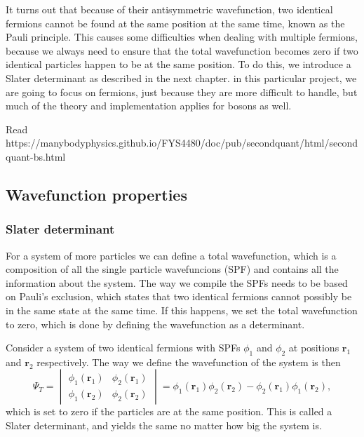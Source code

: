 It turns out that because of their antisymmetric wavefunction, two identical fermions cannot be found at the same position at the same time, known as the Pauli principle. This causes some difficulties when dealing with multiple fermions, because we always need to ensure that the total wavefunction becomes zero if two identical particles happen to be at the same position. To do this, we introduce a Slater determinant as described in the next chapter. in this particular project, we are going to focus on fermions, just because they are more difficult to handle, but much of the theory and implementation applies for bosons as well. 

Read https://manybodyphysics.github.io/FYS4480/doc/pub/secondquant/html/secondquant-bs.html

\subsection{Wavefunction properties} \label{subsec:wavefunction}



\subsubsection{Slater determinant} \label{subsubsec:slater}
For a system of more particles we can define a total wavefunction, which is a composition of all the single particle wavefuncions (SPF) and contains all the information about the system. The way we compile the SPFs needs to be based on Pauli's exclusion, which states that two identical fermions cannot possibly be in the same state at the same time. If this happens, we set the total wavefunction to zero, which is done by defining the wavefunction as a determinant. 

Consider a system of two identical fermions with SPFs $\phi_1$ and $\phi_2$ at positions $\boldsymbol{r}_1$ and $\boldsymbol{r}_2$ respectively. The way we define the wavefunction of the system is then
\begin{equation}
\Psi_T=
\begin{vmatrix}
\phi_1(\boldsymbol{r}_1) & \phi_2(\boldsymbol{r}_1)\\
\phi_1(\boldsymbol{r}_2) & \phi_2(\boldsymbol{r}_2)
\end{vmatrix}
=\phi_1(\boldsymbol{r}_1)\phi_2(\boldsymbol{r}_2)-\phi_2(\boldsymbol{r}_1)\phi_1(\boldsymbol{r}_2),
\end{equation}
which is set to zero if the particles are at the same position. This is called a Slater determinant, and yields the same no matter how big the system is.

